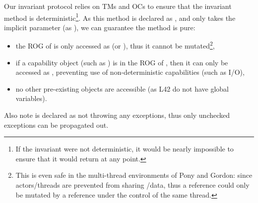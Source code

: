 
Our invariant protocol relies on TMs and OCs to ensure that the invariant method is deterministic\footnote{If the invariant were not deterministic, it would be nearly impossible to ensure that it would return \Q@true@ at any point.}.
As this method is declared as \Q@read@, and only takes the implicit parameter \Q@this@ (as \Q@read@), we can guarantee the method is pure:
\begin{itemize}
\item the ROG of \Q@this@ is only accessed as \Q@read@ (or \Q@imm@), thus it cannot be mutated\footnote{
This is even safe in the multi-thread environments of Pony and Gordon: since actors/threads are prevented from sharing \Q@mut@/\Q@capsule@ data, thus a \Q@read@ reference could only be mutated by a \Q@mut@ reference under the control of the same thread.},
\item if a capability object (such as \Q@System@) is in the ROG of \Q@this@, then it can only be accessed as \Q@read@, preventing use of non-deterministic capabilities (such as I/O),
\item no other pre-existing objects are accessible (as L42 do not have global variables).
\end{itemize}

\noindent Also note \Q@invariant@ is declared as not throwing any exceptions,
	thus only unchecked exceptions can be propagated out.


